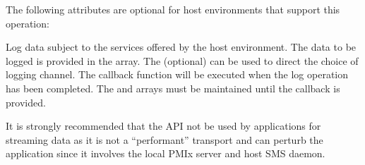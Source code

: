 \reqattrend

\optattrstart
The following attributes are optional for host environments that support this operation:


\optattrend

\descr

Log data subject to the services offered by the host environment. The data to be logged is provided in the  array. The (optional)  can be used to direct the choice of logging channel.
The callback function will be executed when the log operation has been completed. The  and  arrays must be maintained until the callback is provided.

\adviceuserstart
It is strongly recommended that the  API not be used by applications for streaming data as it is not a ``performant'' transport and can perturb the application since it involves the local \ac{PMIx} server and host \ac{SMS} daemon.
\adviceuserend

